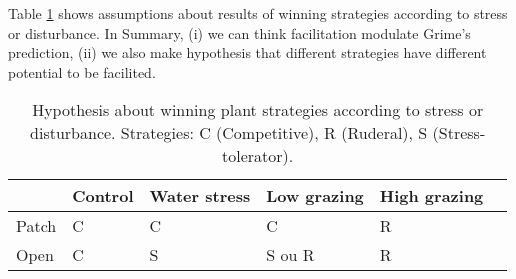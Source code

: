 \documentclass[12pt]{article} %
\begin{document}
Table \ref{hyp} shows assumptions about results of winning strategies according to stress or disturbance. In Summary, (i) we can think facilitation modulate Grime's prediction, (ii) we also make hypothesis that different strategies have different potential to be facilited.



\begin{table}
\begin{center}
\begin{tabular}{|l|l|l|l|l|l|}
  \hline
  & Control & Water stress & Low grazing & High grazing  \\
  \hline
  Patch & C & C & C & R \\
  \hline
  Open & C & S & S ou R & R \\
  \hline
\end{tabular} 
\end{center}
\caption{Hypothesis about winning plant strategies according to stress or disturbance.  Strategies: C (Competitive), R (Ruderal), S (Stress-tolerator). \label{hyp}}
\end{table}






\end{document}
